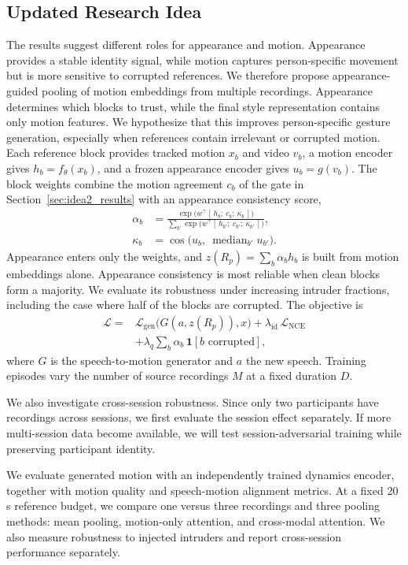 \subsection{Updated Research Idea}

The results suggest different roles for appearance and motion. Appearance provides a stable identity signal, while motion captures person-specific movement but is more sensitive to corrupted references. We therefore propose appearance-guided pooling of motion embeddings from multiple recordings. Appearance determines which blocks to trust, while the final style representation contains only motion features. We hypothesize that this improves person-specific gesture generation, especially when references contain irrelevant or corrupted motion. Each reference block provides tracked motion $x_b$ and video $v_b$, a motion encoder gives $h_b = f_\theta(x_b)$, and a frozen appearance encoder gives $u_b = g(v_b)$. The block weights combine the motion agreement $c_b$ of the gate in Section~\ref{sec:idea2_results} with an appearance consistency score,
\begin{equation}
\begin{aligned}
  \alpha_b &= \frac{\exp\!\big(w^\top [\,h_b;\ c_b;\ \kappa_b\,]\big)}{\sum_{b'} \exp\!\big(w^\top [\,h_{b'};\ c_{b'};\ \kappa_{b'}\,]\big)}, \\
  \kappa_b &= \cos\!\big(u_b,\ \operatorname{median}_{b'} u_{b'}\big).
\end{aligned}
\end{equation}
Appearance enters only the weights, and $z(R_p) = \sum_b \alpha_b h_b$ is built from motion embeddings alone. Appearance consistency is most reliable when clean blocks form a majority. We evaluate its robustness under increasing intruder fractions, including the case where half of the blocks are corrupted. The objective is
\begin{equation}
\begin{aligned}
  \mathcal{L} = {} & \mathcal{L}_{\mathrm{gen}}\big(G(a, z(R_p)), x\big) + \lambda_{\mathrm{id}}\, \mathcal{L}_{\mathrm{NCE}} \\
  & + \lambda_{q} \textstyle\sum_b \alpha_b\, \mathbf{1}[b \text{ corrupted}],
\end{aligned}
\end{equation}
where $G$ is the speech-to-motion generator and $a$ the new speech. Training episodes vary the number of source recordings $M$ at a fixed duration $D$.

We also investigate cross-session robustness. Since only two participants have recordings across sessions, we first evaluate the session effect separately. If more multi-session data become available, we will test session-adversarial training while preserving participant identity.

We evaluate generated motion with an independently trained dynamics encoder, together with motion quality and speech-motion alignment metrics. At a fixed 20\,s reference budget, we compare one versus three recordings and three pooling methods: mean pooling, motion-only attention, and cross-modal attention. We also measure robustness to injected intruders and report cross-session performance separately.
